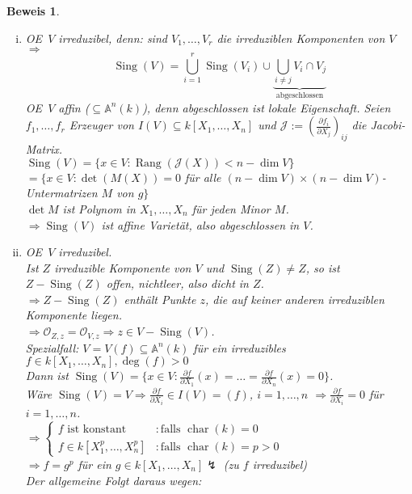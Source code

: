 \documentclass[a4paper,12pt]{report}
\theoremstyle{break}
\theoremstyle{nonumberbreak}
\newtheorem{Bew}{Beweis}
\theoremstyle{nonumberplain}
\newcommand{\quot}[1]{\textrm{\glqq}{#1}\textrm{\grqq}}
\DeclareMathOperator{\Rang}{Rang}
\DeclareMathOperator{\Sing}{Sing}
\DeclareMathOperator{\chara}{char}
\newcommand{\A}{\mathbb{A}}
\newcommand{\calO}{\mathcal{O}}
\newcommand{\calJ}{\mathcal{J}}
\renewcommand{\OE}{O\!\!E~}
\begin{document}
\begin{Bew}\begin{enumerate}[i)]
\item
	\OE $V$ irreduzibel, denn: sind $V_1,\ldots, V_r$ die irreduziblen Komponenten von $V$ $\Rightarrow $ 
		\[\Sing(V)=\bigcup\limits_{i=1}^r \Sing(V_i)\cup \underbrace{\bigcup\limits_{i\ne j}V_i\cap V_j}_{\text{abgeschlossen}}\]
	\OE $V$ affin ($\subseteq\A^n(k)$), denn \quot{abgeschlossen} ist lokale Eigenschaft. Seien $f_1,\ldots ,f_r$ Erzeuger von $I(V)\subseteq k[X_1,\ldots ,X_n]$ und $\calJ:=(\frac{\partial f_i}{\partial X_j})_{ij}$ die Jacobi-Matrix.\\
	$\Sing(V)=\{x\in V: \Rang(\calJ(X))<n-\dim V\}$\\
	$=\{x\in V:\det(M(X))=0$ f\"ur alle $(n-\dim V)\times(n-\dim V)$-Untermatrizen $M$ von $g\}$\\
	$\det M$ ist Polynom in $X_1,\ldots ,X_n$ f\"ur jeden Minor $M$.\\
	$\Rightarrow \Sing(V)$ ist affine Variet\"at, also abgeschlossen in $V$.
\item
	\OE $V$ irreduzibel.\\
	Ist $Z$ irreduzible Komponente von $V$ und $\Sing(Z)\ne Z$, so ist $Z-\Sing(Z)$ offen, nichtleer, also dicht in $Z$.\\
	$\Rightarrow Z-\Sing(Z)$ enth\"alt Punkte $z$, die auf keiner anderen irreduziblen Komponente liegen.\\
	$\Rightarrow \calO_{Z,z}=\calO_{V,z}\Rightarrow z\in V-\Sing(V)$.\\
	Spezialfall: $V=V(f)\subseteq\A^n(k)$ f\"ur ein irreduzibles $f\in k[X_1,\ldots ,X_n], \deg(f)>0$\\
	Dann ist $\Sing(V)=\{x\in V: \frac{\partial f}{\partial X_1}(x)=\ldots =\frac{\partial f}{\partial X_n}(x)=0\}$.\\
	W\"are $\Sing(V)=V\Rightarrow \frac{\partial f}{\partial X_i}\in I(V)=(f)$, $i=1,\ldots ,n$ $\Rightarrow \frac{\partial f}{\partial X_i}=0$ f\"ur $i=1,\ldots ,n$.\\
	$\Rightarrow \left\{\begin{array}{ll}
		f \text{ ist konstant} & :\text{falls } \chara(k)=0\\
		f\in k[X_1^p,\ldots ,X_n^p] & :\text{falls }\chara(k)=p>0
	\end{array}\right.$\\
	$\Rightarrow f=g^p$ f\"ur ein $g\in k[X_1,\ldots ,X_n] \lightning$ (zu $f$ irreduzibel)\\
	Der allgemeine Folgt daraus wegen:
\end{enumerate}\end{Bew}
\end{document}
